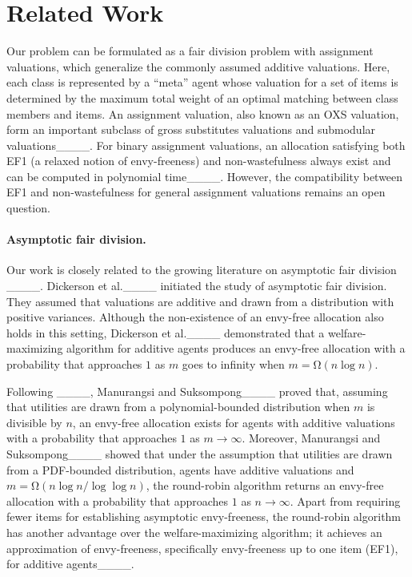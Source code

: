 \section{Related Work}
Our problem can be formulated as a fair division problem with assignment valuations, which generalize the commonly assumed additive valuations.
Here, each class is represented by a ``meta'' agent whose valuation for a set of items is determined by the maximum total weight of an optimal matching between class members and items.
An assignment valuation, also known as an OXS valuation, form an important subclass of gross substitutes valuations and submodular valuations____.
%
For binary assignment valuations, an allocation satisfying both EF1 (a relaxed notion of envy-freeness) and non-wastefulness always exist and can be computed in polynomial time____. 
However, the compatibility between EF1 and non-wastefulness for general assignment valuations remains an open question.
\fi

\paragraph{Asymptotic fair division.}
Our work is closely related to the growing literature on asymptotic fair division ____. 
%
Dickerson et al.____ initiated the study of asymptotic fair division. They assumed that valuations are additive and drawn from a distribution with positive variances. 
Although the non-existence of an envy-free allocation also holds in this setting, Dickerson et al.____ demonstrated that a welfare-maximizing algorithm for additive agents produces an envy-free allocation with a probability that approaches $1$ as $m$ goes to infinity when $m=\mathrm{\Omega}(n\log n)$. 
%

Following ____, Manurangsi and Suksompong____ proved that, assuming that utilities are drawn from a polynomial-bounded distribution when $m$ is divisible by $n$, an envy-free allocation exists for agents with additive valuations with a probability that approaches $1$ as $m\to\infty$.
%
Moreover, Manurangsi and Suksompong____ showed that under the assumption that utilities are drawn from a PDF-bounded distribution, agents have additive valuations and $m=\mathrm{\Omega}(n\log n/\log \log n)$, the round-robin algorithm returns an envy-free allocation with a probability that approaches $1$ as $n\to\infty$. Apart from requiring fewer items for establishing asymptotic envy-freeness, the round-robin algorithm has another advantage over the welfare-maximizing algorithm; it achieves an approximation of envy-freeness, specifically envy-freeness up to one item (EF1), for additive agents____.

